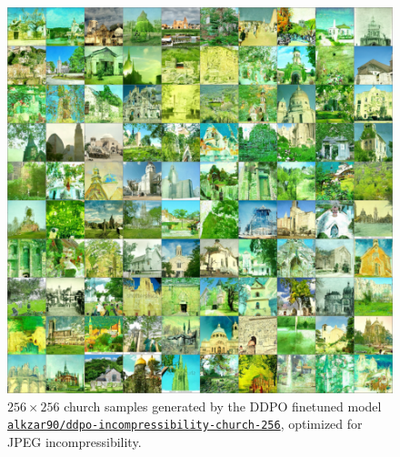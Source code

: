 \begin{appendixs}
        \begin{figure}
            \centering
            \includegraphics[scale=0.8]{img/results/ddpo-church-incompressibility-samples.png}
            \vspace{-4pt}  %
            \captionsetup{width=\textwidth} %
            \caption{$256\times256$ church samples generated by the DDPO finetuned model \href{https://huggingface.co/alkzar90/ddpo-incompressibility-church-256}{\texttt{\texttt{alkzar90/ddpo-incompressibility-church-256}}}, optimized for JPEG incompressibility.}
            \label{fig:ddpo-church-incompressibility-samples}
        \end{figure}


\end{appendixs}
